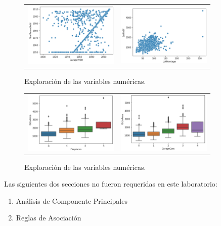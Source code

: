 \begin{figure}[H]
	\centering
	\begin{tabular}{cc}
		\includegraphics[width=45mm]{Images/7} &   \includegraphics[width=45mm]{Images/7.1}
	\end{tabular}
	\caption{Exploración de las variables numéricas.}
		\label{fig:8}
\end{figure}

\begin{figure}[H]
	\centering
	\begin{tabular}{cc}
		\includegraphics[width=45mm]{Images/7.2} &   \includegraphics[width=45mm]{Images/7.3}
	\end{tabular}
	\caption{Exploración de las variables numéricas.}
		\label{fig:9}
\end{figure}


\newpage 


\begin{cajita}
	Las siguientes dos secciones no fueron requeridas en este laboratorio:
	\begin{enumerate}
		\item Análisis de Componente Principales
		\item Reglas de Asociación
	\end{enumerate}
\end{cajita}


